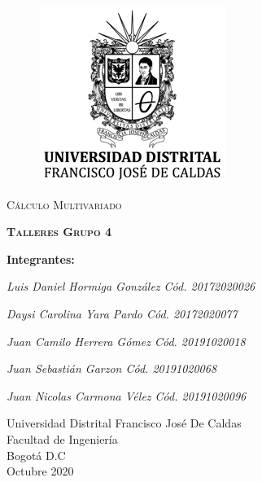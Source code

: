 \documentclass[12pt, letter-paper]{article}
\begin{document}
\begin{titlepage}
    \centering
    \begin{figure}[t]
        \centering
        {\includegraphics[scale=1, width=1.7 in]{Imag/logoUD.png}\par}
    \vspace{1cm}
    \end{figure}
    {\scshape\huge Cálculo Multivariado \par}
    \vspace{0.5cm}
    {\scshape\large \textbf{Talleres Grupo 4} \par}
    \vfill
    \vspace{3cm}
    {\normalsize \textbf{Integrantes:} \par}
    \vspace{0.5cm}
    {\normalsize \textit{Luis Daniel Hormiga González \:\:\: Cód. 20172020026} \par}
    {\normalsize\textit{Daysi Carolina Yara Pardo \:\:\: Cód. 20172020077} \par}
    {\normalsize \textit{Juan Camilo Herrera Gómez \:\: Cód. 20191020018} \par}
    {\normalsize \textit{Juan Sebastián Garzon \:\:\: Cód. 20191020068} \par}
    {\normalsize \textit{Juan Nicolas Carmona Vélez \:\: Cód. 20191020096} \par}
    \vspace{3cm}
    {\scshape\normalsize{Universidad Distrital Francisco José De Caldas \\Facultad de Ingeniería \\Bogotá D.C \\ Octubre 2020 \par}}
    \vfill
\end{titlepage}
\end{document}
